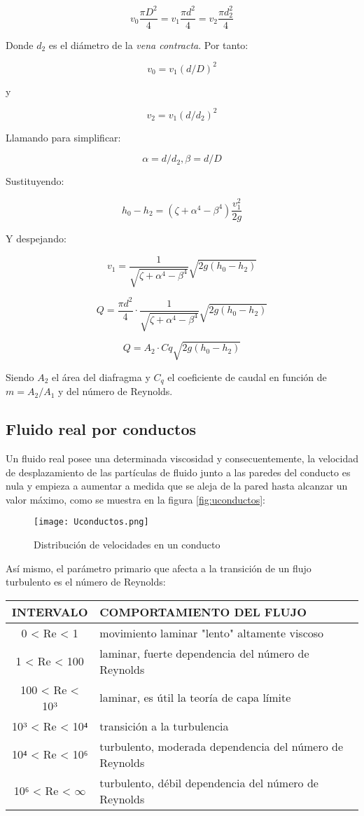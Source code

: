 \[v_{0} \frac{\pi D^2}{4}=v_{1} \frac{\pi d^2}{4}=v_{2} \frac{\pi d_{2}^2}{4}\]

Donde \(d_2\) es el diámetro de la \emph{vena contracta}. Por tanto:

\[v_{0}=v_{1}(d/D)^2\]

y

\[v_{2}=v_{1}(d/d_{2})^2\]

Llamando para simplificar:

\[\alpha = d/d_{2}, \beta =d/D\]

Sustituyendo:

\[h_{0}-h_{2}=(\zeta+\alpha^4-\beta^4)\frac{v_{1}^2}{2g}\]

Y despejando:

\[v_1=\frac{1}{\sqrt{\zeta + \alpha ^4-\beta ^4}}\sqrt{2g(h_{0}-h_{2})}\]

\[Q=\frac{\pi d^2}{4}\cdot \frac{1}{\sqrt{\zeta +\alpha ^4-\beta ^4}}\sqrt{2g(h_{0}-h_{2})}\]

\[Q= A_2 · Cq \sqrt{2g(h_0 -h_2)}\]

Siendo \(A_2\) el área del diafragma y \(C_q\) el coeficiente de caudal
en función de \(m=A_2 /A_1\) y del número de Reynolds.

\subsection{Fluido real por conductos}\label{header-n94}

Un fluido real posee una determinada viscosidad y consecuentemente, la
velocidad de desplazamiento de las partículas de fluido junto a las
paredes del conducto es nula y empieza a aumentar a medida que se aleja
de la pared hasta alcanzar un valor máximo, como se muestra en la
figura \autoref{fig:uconductos}:

\begin{figure}
\centering
\texttt{[image: Uconductos.png]}
\caption[Distribución de velocidades]{Distribución de velocidades en un conducto \cite{Luszczewski99}}
\label{fig:uconductos}
\end{figure}

Así mismo, el parámetro primario que afecta a la transición de un flujo
turbulento es el número de Reynolds:

\begin{longtable}[]{@{}cl@{}}
\toprule
INTERVALO & COMPORTAMIENTO DEL FLUJO\tabularnewline
\midrule
\endhead
0 \textless{} Re \textless{} 1 & movimiento laminar "lento" altamente
viscoso\tabularnewline
1 \textless{} Re \textless{} 100 & laminar, fuerte dependencia del
número de Reynolds\tabularnewline
100 \textless{} Re \textless{} 10³ & laminar, es útil la teoría de capa
límite\tabularnewline
10³ \textless{} Re \textless{} 10⁴ & transición a la
turbulencia\tabularnewline
10⁴ \textless{} Re \textless{} 10⁶ & turbulento, moderada dependencia
del número de Reynolds\tabularnewline
10⁶ \textless{} Re \textless{} \(\infty\) & turbulento, débil
dependencia del número de Reynolds\tabularnewline
\bottomrule
\end{longtable}

